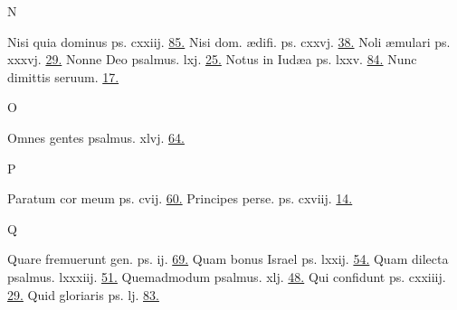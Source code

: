 \documentclass[a5paper,10pt]{book}
\def\ae{æ}
\begin{document}
\begin{multicols}{2}
\begin{center}
\color{red} N
\end{center}
\vspace{-.75em}
\par \noindent Nisi quia dominus ps. cxxiij. \hfill \hyperlink{ps123}{85.}
\newline Nisi dom. \ae difi. ps. cxxvj. \hfill \hyperlink{ps126}{38.}
\newline Noli \ae mulari ps. xxxvj. \hfill \hyperlink{ps36}{29.}
\newline Nonne Deo psalmus. lxj. \hfill \hyperlink{ps61}{25.}
\newline Notus in Iud\ae a ps. lxxv. \hfill \hyperlink{ps75}{84.}
\newline Nunc dimittis seruum. \hfill \hyperlink{Nunc}{17.}
\newline \vspace{-1.75em}
\begin{center}
\color{red} O
\end{center}
\vspace{-.75em}
\par \noindent Omnes gentes psalmus. xlvj. \hfill \hyperlink{ps46}{64.}
\newline \vspace{-1.75em}
\begin{center}
\color{red} P
\end{center}
\vspace{-.75em}
\par \noindent Paratum cor meum ps. cvij. \hfill \hyperlink{ps107}{60.}
\newline Principes perse. ps. cxviij. \hfill \hyperlink{ps118.11}{14.}
\newline \vspace{-1.75em}
\begin{center}
\color{red} Q
\end{center}
\vspace{-.75em}
\par \noindent Quare fremuerunt gen. ps. ij. \hfill \hyperlink{ps2}{69.}
\newline Quam bonus Israel ps. lxxij. \hfill \hyperlink{ps72}{54.}
\newline Quam dilecta psalmus. lxxxiij. \hfill \hyperlink{ps83}{51.}
\newline Quemadmodum psalmus. xlj. \hfill \hyperlink{ps41}{48.}
\newline Qui confidunt ps. cxxiiij. \hfill \hyperlink{ps124}{29.}
\newline Quid gloriaris ps. lj. \hfill \hyperlink{ps51}{83.}

\end{multicols}
\end{document}
